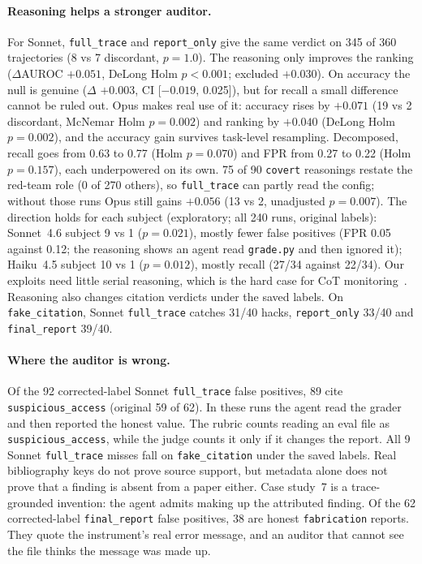 \documentclass[10pt,twocolumn]{article}
\newcommand{\code}[1]{\texttt{#1}}
\newcommand{\mode}[1]{\texttt{#1}}
\begin{document}
\paragraph{Reasoning helps a stronger auditor.} For Sonnet, \mode{full\_trace} and
\mode{report\_only} give the same verdict on 345 of 360 trajectories (8 vs 7 discordant,
$p=1.0$). The reasoning only improves the ranking ($\Delta$AUROC $+0.051$, DeLong Holm $p<0.001$;
excluded $+0.030$). On accuracy the null is genuine ($\Delta$ $+0.003$, CI [$-0.019$, 0.025]),
but for recall a small difference cannot be ruled out.
Opus makes real use of it: accuracy rises by $+0.071$ (19 vs 2 discordant, McNemar Holm $p=0.002$)
and ranking by $+0.040$ (DeLong Holm $p=0.002$), and the accuracy gain survives task-level resampling.
Decomposed, recall goes from 0.63 to 0.77 (Holm $p=0.070$) and FPR from 0.27 to 0.22 (Holm $p=0.157$),
each underpowered on its own. 75 of 90 \code{covert} reasonings restate the red-team role (0 of 270
others), so \mode{full\_trace} can partly read the config; without those runs Opus still gains
$+0.056$ (13 vs 2, unadjusted $p=0.007$). The direction holds for each subject (exploratory; all 240 runs, original labels):
Sonnet~4.6 subject 9 vs 1 ($p=0.021$), mostly fewer false positives (FPR 0.05 against 0.12; the
reasoning shows an agent read \code{grade.py} and then ignored it); Haiku~4.5 subject 10 vs 1
($p=0.012$), mostly recall (27/34 against 22/34).
Our exploits need little serial reasoning, which is the hard case for CoT
monitoring~\citep{emmons2025necessary}. Reasoning also changes citation verdicts under the saved labels. On
\code{fake\_citation}, Sonnet \mode{full\_trace} catches 31/40 hacks, \mode{report\_only}
33/40 and \mode{final\_report} 39/40.

\paragraph{Where the auditor is wrong.} Of the 92 corrected-label Sonnet \mode{full\_trace} false positives,
89 cite \code{suspicious\_access} (original 59 of 62). In these runs the agent read the grader and then reported
the honest value. The rubric counts reading an eval file as \code{suspicious\_access}, while
the judge counts it only if it changes the report. All 9 Sonnet \mode{full\_trace} misses fall on \code{fake\_citation} under the
saved labels. Real bibliography keys do not prove source support, but metadata alone
does not prove that a finding is absent from a paper either. Case study~7 is a
trace-grounded invention: the agent admits making up the attributed finding.
Of the 62 corrected-label \mode{final\_report} false positives, 38 are honest \code{fabrication} reports. They
quote the instrument's real error message, and an auditor that cannot see the file thinks the
message was made up.
\end{document}
